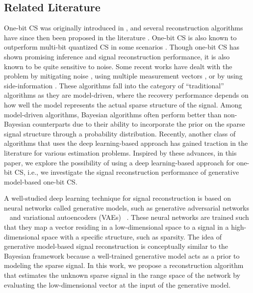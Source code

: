 \documentclass[journal]{IEEEtran}
\begin{document}
\subsection{Related Literature}
One-bit CS was originally introduced in \cite{boufounos20081}, and several reconstruction algorithms have since then been proposed in the literature  \cite{kamilov, musa, kafle2016, binarystableEmbedd,plan2012robust,baraniukexponential, normEstimation,classification_binaryGAMP,kafle2019noisy, xu2014bayesian,kafle2021one}. One-bit CS is also known to outperform multi-bit quantized CS in some scenarios \cite{regimeCh_Laska}. Though one-bit CS has shown promising inference and signal reconstruction performance, it is also known to be quite sensitive to noise\cite{r1bcs, kafleLaplacian, yan2012robust}. Some recent works have dealt with the problem by mitigating noise \cite{kamilov, musa, plan2012robust}, using multiple measurement vectors \cite{kafle}, or by using side-information \cite{kafleLaplacian}. 
These algorithms fall into the category of ``traditional'' algorithms as they are model-driven, where the recovery performance depends on how well the model represents the actual sparse structure of the signal. Among model-driven algorithms, Bayesian algorithms often perform better than non-Bayesian counterparts due to their ability to incorporate the prior on the sparse signal structure through a probability distribution. Recently, another class of algorithms that uses the deep learning-based approach has gained traction in the literature \cite{bora2017compressed} for various estimation problems. Inspired by these advances, in this paper, we explore the possibility of using a deep learning-based approach for one-bit CS, i.e., we investigate the signal reconstruction performance of generative model-based one-bit CS. 

A well-studied deep learning technique for signal reconstruction is based on neural networks called generative models, such as generative adversarial networks ~\cite{goodfellow2014generative}  and variational autoencoders (VAEs) ~\cite{kingma2013auto}. These neural networks are trained such that they map a vector residing in a low-dimensional space to a signal in a high-dimensional space with a specific structure, such as sparsity. 
The idea of generative model-based signal reconstruction is conceptually similar to the Bayesian framework because a well-trained generative model acts as a prior to modeling the sparse signal. In this work, we propose a reconstruction algorithm that estimates the unknown sparse signal in the range space of the network by evaluating the low-dimensional vector at the input of the generative model.
\end{document}
